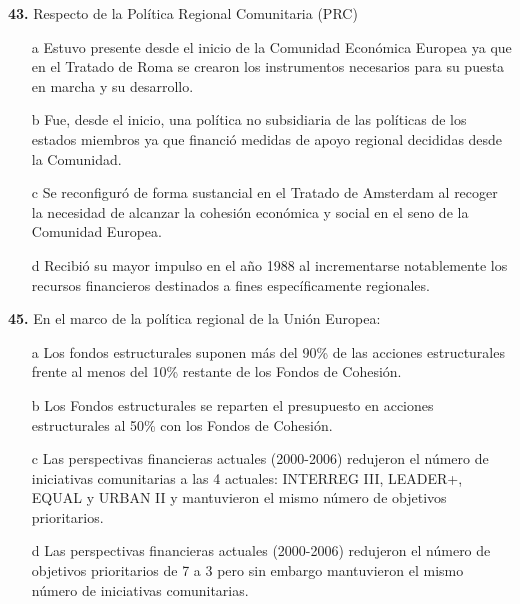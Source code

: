 \documentclass{nuevotema}
\begin{document}
\textbf{43.} Respecto de la Política Regional Comunitaria (PRC)
\begin{itemize}
	\item[a] Estuvo presente desde el inicio de la Comunidad Económica Europea ya que en el Tratado de Roma se crearon los instrumentos necesarios para su puesta en marcha y su desarrollo.
	\item[b] Fue, desde el inicio, una política no subsidiaria de las políticas de los estados miembros ya que financió medidas de apoyo regional decididas desde la Comunidad.
	\item[c] Se reconfiguró de forma sustancial en el Tratado de Amsterdam al recoger la necesidad de alcanzar la cohesión económica y social en el seno de la Comunidad Europea.
	\item[d] Recibió su mayor impulso en el año 1988 al incrementarse notablemente los recursos financieros destinados a fines específicamente regionales.
\end{itemize}

\textbf{45.} En el marco de la política regional de la Unión Europea:

\begin{itemize}
	\item[a] Los fondos estructurales suponen más del 90\% de las acciones estructurales frente al menos del 10\% restante de los Fondos de Cohesión.
	\item[b] Los Fondos estructurales se reparten el presupuesto en acciones estructurales al 50\% con los Fondos de Cohesión.
	\item[c] Las perspectivas financieras actuales (2000-2006) redujeron el número de iniciativas comunitarias a las 4 actuales: INTERREG III, LEADER+, EQUAL y URBAN II y mantuvieron el mismo número de objetivos prioritarios.
	\item[d] Las perspectivas financieras actuales (2000-2006) redujeron el número de objetivos prioritarios de 7 a 3 pero sin embargo mantuvieron el mismo número de iniciativas comunitarias.
\end{itemize}
\end{document}
